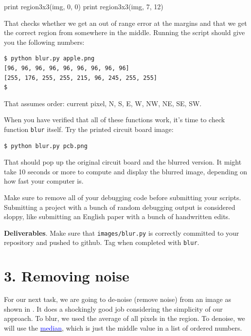 \begin{pyverbatim}
print region3x3(img, 0, 0)
print region3x3(img, 7, 12)
\end{pyverbatim}

\noindent That checks whether we get an out of range error at the margins and that we get the correct region from somewhere in the middle. Running the script should give you the following numbers:

\begin{lstlisting}[style=BashInputStyle]
$ python blur.py apple.png
[96, 96, 96, 96, 96, 96, 96, 96, 96]
[255, 176, 255, 255, 215, 96, 245, 255, 255]
$ 
\end{lstlisting}

\noindent That assumes order: current pixel, N, S, E, W, NW, NE, SE, SW.

When you have verified that all of these functions work, it's time to check function {\tt blur} itself. Try the printed circuit board image:

\begin{lstlisting}[style=BashInputStyle]
$ python blur.py pcb.png 
\end{lstlisting}

\noindent That should pop up the original circuit board and the blurred version. It might take 10 seconds or more to compute and display the blurred image, depending on how fast your computer is.

\begin{callout}{\bctakecare}
Make sure to remove all of your debugging code before submitting your scripts. Submitting a project with a bunch of random debugging output is considered sloppy, like submitting an English paper with a bunch of handwritten edits.
\end{callout}

\begin{callout}{\bcplume}
{\bf Deliverables}. Make sure that {\tt images/blur.py} is correctly committed to your repository and pushed to github. Tag when completed with {\tt blur}.
\end{callout}

\section{3. Removing noise}

For our next task, we are going to de-noise (remove noise) from an image as shown in . It does a shockingly good job considering the simplicity of our approach. To blur, we used the average of all pixels in the region. To denoise, we will use the \href{http://en.wikipedia.org/wiki/Median}{\textcolor{blue}{median}}, which is just the middle value in a list of ordered numbers.

